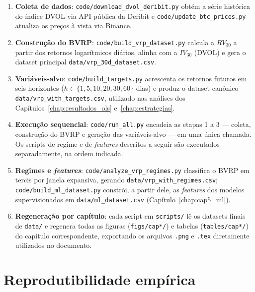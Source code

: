 \begin{enumerate}
    \item \textbf{Coleta de dados}: \texttt{code/download\_dvol\_deribit.py}
          obtém a série histórica do índice DVOL via API pública da Deribit e
          \texttt{code/update\_btc\_prices.py} atualiza os preços à vista via
          Binance.

    \item \textbf{Construção do BVRP}: \texttt{code/build\_vrp\_dataset.py}
          calcula a $RV_{30}$ a partir dos retornos logarítmicos diários,
          alinha com a $IV_{30}$ (DVOL) e gera o dataset principal
          \texttt{data/vrp\_30d\_dataset.csv}.

    \item \textbf{Variáveis-alvo}: \texttt{code/build\_targets.py} acrescenta
          os retornos futuros em seis horizontes
          ($h \in \{1, 5, 10, 20, 30, 60\}$ dias) e produz o dataset canônico
          \texttt{data/vrp\_with\_targets.csv}, utilizado nas análises dos
          Capítulos~\ref{chap:resultados_ols} e~\ref{chap:estrategias}.

    \item \textbf{Execução sequencial}: \texttt{code/run\_all.py} encadeia as
          etapas 1 a 3 --- coleta, construção do BVRP e geração das
          variáveis-alvo --- em uma única chamada. Os scripts de regime e de
          \textit{features} descritos a seguir são executados separadamente, na
          ordem indicada.

    \item \textbf{Regimes e \textit{features}}:
          \texttt{code/analyze\_vrp\_regimes.py} classifica o BVRP em tercis
          por janela expansiva, gerando \texttt{data/vrp\_with\_regimes.csv};
          \texttt{code/build\_ml\_dataset.py} constrói, a partir dele, as
          \textit{features} dos modelos supervisionados em
          \texttt{data/ml\_dataset.csv} (Capítulo~\ref{chap:cap5_ml}).

    \item \textbf{Regeneração por capítulo}: cada script em \texttt{scripts/}
          lê os datasets finais de \texttt{data/} e regenera todas as figuras
          (\texttt{figs/cap*/}) e tabelas (\texttt{tables/cap*/}) do capítulo
          correspondente, exportando os arquivos \texttt{.png} e \texttt{.tex}
          diretamente utilizados no documento.
\end{enumerate}

\section{Reprodutibilidade empírica}

